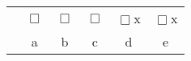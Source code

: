 \begin{center}
\begin{tabular}{c c c c c c}
& $\Box$ & $\Box$  & $\Box$   & $\Box$\hspace{-0.25cm}x     & $\Box$\hspace{-0.25cm}x   \\
& a & b  & c  & d  & e \\
\end{tabular}
\end{center}
